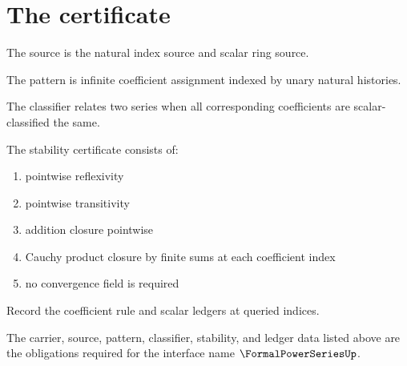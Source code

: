 \section{The certificate}

\begin{definition}
\label{def:fps-source-specification}
The source is the natural index source and scalar ring source.
\end{definition}

\begin{definition}
\label{def:fps-pattern-specification}
The pattern is infinite coefficient assignment indexed by unary natural histories.
\end{definition}

\begin{definition}
\label{def:fps-classifier-specification}
The classifier relates two series when all corresponding coefficients are scalar-classified the same.
\end{definition}

\begin{definition}
\label{def:fps-stability-certificate}
The stability certificate consists of:
\begin{enumerate}
  \item pointwise reflexivity
  \item pointwise transitivity
  \item addition closure pointwise
  \item Cauchy product closure by finite sums at each coefficient index
  \item no convergence field is required
\end{enumerate}
\end{definition}

\begin{definition}
\label{def:fps-ledger-policy}
Record the coefficient rule and scalar ledgers at queried indices.
\end{definition}

\begin{definition}
\label{def:fps-certificate-obligations}
The carrier, source, pattern, classifier, stability, and ledger data listed above are the obligations required for the interface name \(\FormalPowerSeriesUp\).
\end{definition}

